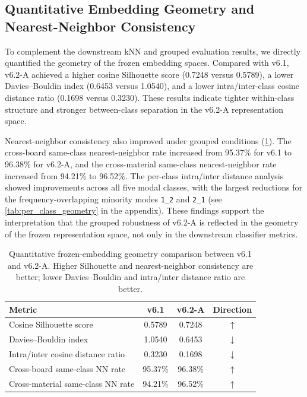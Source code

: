 \documentclass[review,3p,times]{elsarticle}
\begin{document}
\subsection{Quantitative Embedding Geometry and Nearest-Neighbor Consistency}
To complement the downstream kNN and grouped evaluation results, we directly quantified the geometry of the frozen embedding spaces. Compared with v6.1, v6.2-A achieved a higher cosine Silhouette score (0.7248 versus 0.5789), a lower Davies--Bouldin index (0.6453 versus 1.0540), and a lower intra/inter-class cosine distance ratio (0.1698 versus 0.3230). These results indicate tighter within-class structure and stronger between-class separation in the v6.2-A representation space.

Nearest-neighbor consistency also improved under grouped conditions (\cref{tab:embedding_geometry}). The cross-board same-class nearest-neighbor rate increased from 95.37\% for v6.1 to 96.38\% for v6.2-A, and the cross-material same-class nearest-neighbor rate increased from 94.21\% to 96.52\%. The per-class intra/inter distance analysis showed improvements across all five modal classes, with the largest reductions for the frequency-overlapping minority modes \texttt{1\_2} and \texttt{2\_1} (see \cref{tab:per_class_geometry} in the appendix). These findings support the interpretation that the grouped robustness of v6.2-A is reflected in the geometry of the frozen representation space, not only in the downstream classifier metrics.

\begin{table}[htbp]
\centering
\caption{Quantitative frozen-embedding geometry comparison between v6.1 and v6.2-A. Higher Silhouette and nearest-neighbor consistency are better; lower Davies--Bouldin and intra/inter distance ratio are better.}
\label{tab:embedding_geometry}
\begin{tabular}{lccc}
\toprule
\textbf{Metric} & \textbf{v6.1} & \textbf{v6.2-A} & \textbf{Direction} \\
\midrule
Cosine Silhouette score & 0.5789 & 0.7248 & $\uparrow$ \\
Davies--Bouldin index & 1.0540 & 0.6453 & $\downarrow$ \\
Intra/inter cosine distance ratio & 0.3230 & 0.1698 & $\downarrow$ \\
Cross-board same-class NN rate & 95.37\% & 96.38\% & $\uparrow$ \\
Cross-material same-class NN rate & 94.21\% & 96.52\% & $\uparrow$ \\
\bottomrule
\end{tabular}
\end{table}
\end{document}
